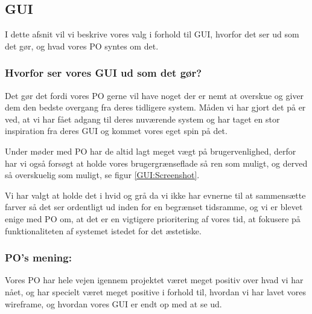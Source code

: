 \subsection{GUI}
I dette afsnit vil vi beskrive vores valg i forhold til GUI, hvorfor det ser ud som det gør, og hvad vores PO syntes om det.

\subsubsection{Hvorfor ser vores GUI ud som det gør?}
Det gør det fordi vores PO gerne vil have noget der er nemt at overskue og giver dem den bedste overgang fra deres tidligere system.
Måden vi har gjort det på er ved, at vi har fået adgang til deres nuværende system og har taget en stor inspiration fra deres GUI og kommet vores eget spin på det.

Under møder med PO har de altid lagt meget vægt på brugervenlighed, derfor har vi også forsøgt at holde vores brugergrænseflade så ren som muligt, og derved så overskuelig som muligt, se figur \ref{GUI:Screenshot}.

Vi har valgt at holde det i hvid og grå da vi ikke har evnerne til at sammensætte farver så det ser ordentligt ud inden for en begrænset tidsramme, og vi er blevet enige med PO om, at det er en vigtigere prioritering af vores tid, at fokusere på funktionaliteten af systemet istedet for det æstetiske.

\subsubsection{PO's mening:}
Vores PO har hele vejen igennem projektet været meget positiv over hvad vi har nået, og har specielt været meget positive i forhold til, hvordan vi har lavet vores wireframe, og hvordan vores GUI er endt op med at se ud.